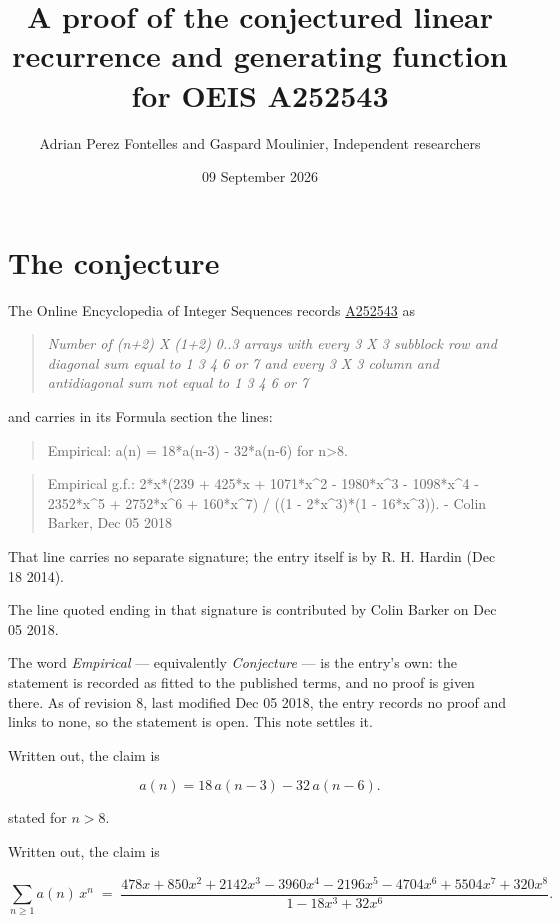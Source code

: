 \documentclass[11pt]{article}
\title{A proof of the conjectured linear recurrence and generating function for OEIS A252543}
\author{Adrian Perez Fontelles and Gaspard Moulinier, Independent researchers}
\date{09 September 2026}
\theoremstyle{definition}
\begin{document}
\maketitle
\section{The conjecture}

The Online Encyclopedia of Integer Sequences records \href{https://oeis.org/A252543}{A252543} as

\begin{quote}\itshape Number of (n+2) X (1+2) 0..3 arrays with every 3 X 3 subblock row and diagonal sum equal to 1 3 4 6 or 7 and every 3 X 3 column and antidiagonal sum not equal to 1 3 4 6 or 7\end{quote}

and carries in its Formula section the lines:

\begin{quote}\ttfamily Empirical: a(n) = 18*a(n-3) - 32*a(n-6) for n>8.\end{quote}

\begin{quote}\ttfamily Empirical g.f.: 2*x*(239 + 425*x + 1071*x\textasciicircum{}2 - 1980*x\textasciicircum{}3 - 1098*x\textasciicircum{}4 - 2352*x\textasciicircum{}5 + 2752*x\textasciicircum{}6 + 160*x\textasciicircum{}7) / ((1 - 2*x\textasciicircum{}3)*(1 - 16*x\textasciicircum{}3)). - Colin Barker, Dec 05 2018\end{quote}

That line carries no separate signature; the entry itself is by R. H. Hardin (Dec 18 2014).

The line quoted ending in that signature is contributed by Colin Barker on Dec 05 2018.

The word {\itshape Empirical} --- equivalently {\itshape Conjecture} --- is the entry's own: the statement is recorded as fitted to the published terms, and no proof is given there. As of revision 8, last modified Dec 05 2018, the entry records no proof and links to none, so the statement is open. This note settles it.

Written out, the claim is

\[a(n) = 18\,a(n-3) - 32\,a(n-6).\]

stated for $n > 8$.

Written out, the claim is

\[\sum_{n \ge 1} a(n)\,x^n \;=\; \frac{478x + 850x^{2} + 2142x^{3} - 3960x^{4} - 2196x^{5} - 4704x^{6} + 5504x^{7} + 320x^{8}}{1 - 18x^{3} + 32x^{6}}.\]
\end{document}
